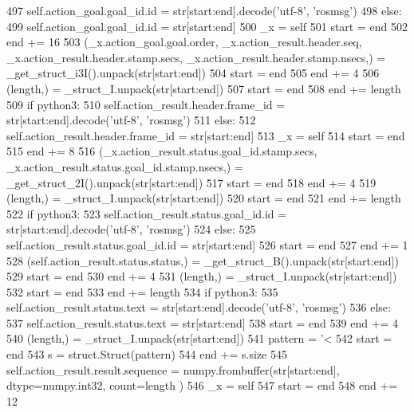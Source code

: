 \begin{DoxyCode}
497         self.action\_goal.goal\_id.id = str[start:end].decode(\textcolor{stringliteral}{'utf-8'}, \textcolor{stringliteral}{'rosmsg'})
498       \textcolor{keywordflow}{else}:
499         self.action\_goal.goal\_id.id = str[start:end]
500       \_x = self
501       start = end
502       end += 16
503       (\_x.action\_goal.goal.order, \_x.action\_result.header.seq, \_x.action\_result.header.stamp.secs, 
      \_x.action\_result.header.stamp.nsecs,) = \_get\_struct\_i3I().unpack(str[start:end])
504       start = end
505       end += 4
506       (length,) = \_struct\_I.unpack(str[start:end])
507       start = end
508       end += length
509       \textcolor{keywordflow}{if} python3:
510         self.action\_result.header.frame\_id = str[start:end].decode(\textcolor{stringliteral}{'utf-8'}, \textcolor{stringliteral}{'rosmsg'})
511       \textcolor{keywordflow}{else}:
512         self.action\_result.header.frame\_id = str[start:end]
513       \_x = self
514       start = end
515       end += 8
516       (\_x.action\_result.status.goal\_id.stamp.secs, \_x.action\_result.status.goal\_id.stamp.nsecs,) = 
      \_get\_struct\_2I().unpack(str[start:end])
517       start = end
518       end += 4
519       (length,) = \_struct\_I.unpack(str[start:end])
520       start = end
521       end += length
522       \textcolor{keywordflow}{if} python3:
523         self.action\_result.status.goal\_id.id = str[start:end].decode(\textcolor{stringliteral}{'utf-8'}, \textcolor{stringliteral}{'rosmsg'})
524       \textcolor{keywordflow}{else}:
525         self.action\_result.status.goal\_id.id = str[start:end]
526       start = end
527       end += 1
528       (self.action\_result.status.status,) = \_get\_struct\_B().unpack(str[start:end])
529       start = end
530       end += 4
531       (length,) = \_struct\_I.unpack(str[start:end])
532       start = end
533       end += length
534       \textcolor{keywordflow}{if} python3:
535         self.action\_result.status.text = str[start:end].decode(\textcolor{stringliteral}{'utf-8'}, \textcolor{stringliteral}{'rosmsg'})
536       \textcolor{keywordflow}{else}:
537         self.action\_result.status.text = str[start:end]
538       start = end
539       end += 4
540       (length,) = \_struct\_I.unpack(str[start:end])
541       pattern = \textcolor{stringliteral}{'<%
542       start = end
543       s = struct.Struct(pattern)
544       end += s.size
545       self.action\_result.result.sequence = numpy.frombuffer(str[start:end], dtype=numpy.int32, count=length
      )
546       \_x = self
547       start = end
548       end += 12
}
\end{DoxyCode}
